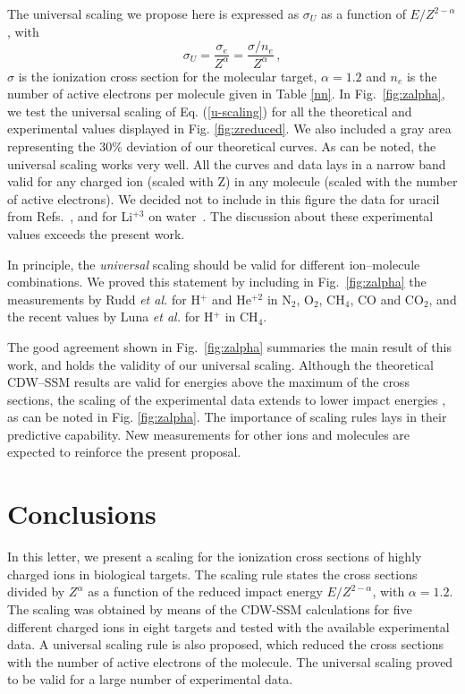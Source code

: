 \documentclass[10pt,showpacs,showkeys,twocolumn]{revtex4}
\begin{document}
The universal scaling we propose here is expressed as $\sigma_U$ as a function of $E/Z^{2-\alpha}$, with
 \begin{equation}
     \sigma_U=\frac{\sigma_e}{Z^{\alpha}}=\frac{\sigma/n_e}{Z^{\alpha}}\,,
     \label{u-scaling}
 \end{equation}
$\sigma$ is the ionization cross section for the molecular target, $\alpha=1.2$ and $n_e$ is the number of active electrons per molecule given in Table \ref{nn}.
In Fig.~\ref{fig:zalpha}, we test the universal scaling of Eq. (\ref{u-scaling}) for all the theoretical and experimental values displayed in Fig. \ref{fig:zreduced}. We also included a gray area representing the 30\% deviation of our theoretical curves. As can be noted, the universal scaling works very well. All the curves and data lays in a narrow band valid for any charged ion (scaled with Z) in any molecule (scaled with the number of active electrons). 
We decided not to include in this figure the data for uracil from Refs.~\cite{agnihotri2012,agnihotri2013}, and for Li$^{+3}$ on water~\cite{Luna_Li_water}. The discussion about these experimental values exceeds the present work. %

In principle, the \textit{universal} scaling should be valid for different ion--molecule combinations. 
We proved this statement by including in Fig.~\ref{fig:zalpha} the measurements by Rudd \textit{et al.} \cite{Rudd85,Rudd1983} for H$^{+}$ and He$^{+2}$ in N$_2$, O$_2$, CH$_4$, CO and CO$_2$, and the recent values by Luna \textit{et al.} \cite{Luna2019} for H$^{+}$ in CH$_4$. 

The good agreement shown in Fig.~\ref{fig:zalpha} summaries the main result of this work, and holds the validity of our universal scaling. Although the theoretical CDW--SSM results  %
are valid for energies above the maximum of the cross sections, the scaling of the experimental data extends to lower impact energies%
, as can be noted in Fig. \ref{fig:zalpha}.
The importance of scaling rules lays in their predictive capability. New measurements for other ions and molecules are expected to reinforce the present proposal. 

\section{Conclusions}
In this letter, we present a scaling for the ionization cross sections of highly charged ions in biological targets. The scaling rule states the cross sections divided by $Z^{\alpha}$ as a function of the reduced impact energy $E/Z^{2-\alpha}$, with $\alpha=1.2$. The scaling was obtained by means of the CDW-SSM calculations for five different charged ions in eight targets and tested with the available experimental data. A universal scaling rule  is also proposed, which reduced the cross sections with the number of active electrons of the molecule. The universal scaling proved to be valid for a large number of experimental data.
\end{document}
